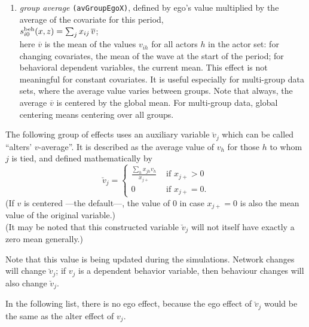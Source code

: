 \documentclass[a4paper,fleqn,11pt]{article}
\newcommand{\+}{\, + \,}
\newcommand{\vit}{\theenumi}
\begin{document}
\begin{enumerate}
 \item {\em group average} \texttt{(avGroupEgoX)}, defined by ego's value multiplied by the
 average of the covariate for this period,  \\
 $s^{\rm beh}_{i\vit}(x, z) =  \sum_j x_{ij} \, \overline {v}  $;\\
 here $\overline {v}$ is the mean of the values $v_{ih}$ for all actors $h$
 in the actor set: for changing covariates, the mean of the wave at the
 start of the period; for behavioral dependent variables,
 the current mean.
 This effect is not meaningful for constant covariates.
 It is useful especially for multi-group data sets, where the average value
 varies between groups.
 Note that always, the average $\overline {v} $ is centered by the global mean.
 For multi-group data, global centering means centering over all groups.
\end{enumerate}

\noindent
The following group of effects uses an auxiliary variable $\breve v_j$ which
can be called ``alters' $v$-average''.
It is described as the average value of $v_h$ for those $h$
to whom $j$ is tied, and defined mathematically by
\begin{equation}
  \breve v_j = \left\{\begin{array}{ll} \displaystyle
         \frac{\sum_h x_{jh}v_h}{x_{j+}}  &  \text{ if } x_{j+} > 0     \\
         0                                &  \text{ if } x_{j+} = 0  .
  \end{array}   \right.            \label{alt_av}
\end{equation}
(If $v$ is centered ---the default---, the value of 0 in case $x_{j+} = 0$
is also the mean value of the original variable.)\\
(It may be noted that this constructed variable $\breve v_j$
will not itself have exactly a zero mean generally.)

Note that this value is being updated during the simulations.
Network changes will change $\breve v_j$; if $v_j$ is a dependent behavior
variable, then behaviour changes will also change $\breve v_j$.

In the following list, there is no ego effect, because the ego effect
of $\breve v_j$ would be the same as the alter effect of $v_j$.
\end{document}

